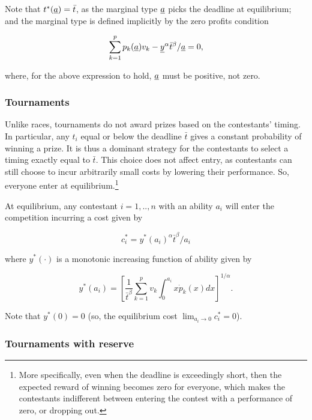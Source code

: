 \documentclass[11pt, titlepage]{article}
\newcommand\deadline{\bar{t}}
\newcommand\target{\underline{y}}
\begin{document}
Note that \(t^*(\marginal)=\deadline\), as the marginal type
\(\underline{a}\) picks the deadline at equilibrium; and the marginal type
is defined implicitly by the zero profits condition

\begin{equation}
    \label{zero profits}
    \sum_{k=1}^p p_{k}(\marginal) v_k - \target^\alpha \deadline^\beta / \marginal = 0, 
\end{equation}

where, for the above expression to hold, \(\underline{a}\) must be positive,
not zero.

\subsubsection{Tournaments}\label{tournaments}

Unlike races, tournaments do not award prizes based on the contestants'
timing. In particular, any \(t_i\) equal or below the deadline
\(\deadline\) gives a constant probability of winning a prize. It is
thus a dominant strategy for the contestants to select a timing exactly
equal to \(\deadline\). This choice does not affect entry, as
contestants can still choose to incur arbitrarily small costs by
lowering their performance. So, everyone enter at equilibrium.\footnote{More
  specifically, even when the deadline is exceedingly short, then the
  expected reward of winning becomes zero for everyone, which makes the
  contestants indifferent between entering the contest with a
  performance of zero, or dropping out.}

At equilibrium, any contestant \(i=1, .., n\) with an ability \(a_i\)
will enter the competition incurring a cost given by

\begin{equation}
    \label{cost tournaments}
    c_i^* = y^*(a_i)^\alpha \deadline^\beta / a_i
\end{equation}

where \(y^*(\cdot)\) is a monotonic increasing function of ability given
by

\begin{equation}
        y^*(a_i) = 
        \left[\frac{1}{\deadline^\beta}\sum_{k=1}^{p} v_k \int_{0}^{a_i} x \dot p_k(x) d x \right]^{1/\alpha}. 
\end{equation}

Note that \(y^*(0)=0\) (so, the equilibrium cost
\(\lim_{a_i\to 0} c_i^* = 0\)).

\subsubsection{Tournaments with reserve}\label{tournaments-with-reserve}
\end{document}
